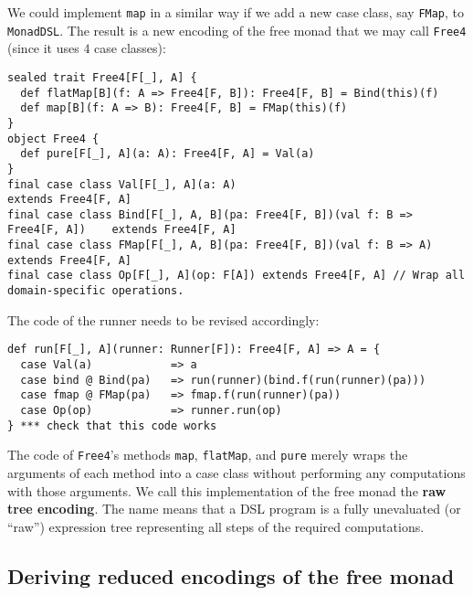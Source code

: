 We could implement \lstinline!map!
in a similar way if we add a new case class, say \lstinline!FMap!,
to \lstinline!MonadDSL!.
The result is a new encoding of the free monad that we may call \lstinline!Free4!
(since it uses $4$ case classes):
\begin{lstlisting}
sealed trait Free4[F[_], A] {
  def flatMap[B](f: A => Free4[F, B]): Free4[F, B] = Bind(this)(f)
  def map[B](f: A => B): Free4[F, B] = FMap(this)(f)
}
object Free4 {
  def pure[F[_], A](a: A): Free4[F, A] = Val(a)
}
final case class Val[F[_], A](a: A)                                            extends Free4[F, A]
final case class Bind[F[_], A, B](pa: Free4[F, B])(val f: B => Free4[F, A])    extends Free4[F, A]
final case class FMap[F[_], A, B](pa: Free4[F, B])(val f: B => A)              extends Free4[F, A]
final case class Op[F[_], A](op: F[A]) extends Free4[F, A] // Wrap all domain-specific operations.
\end{lstlisting}
The code of the runner needs to be revised accordingly:
\begin{lstlisting}
def run[F[_], A](runner: Runner[F]): Free4[F, A] => A = {
  case Val(a)            => a
  case bind @ Bind(pa)   => run(runner)(bind.f(run(runner)(pa)))
  case fmap @ FMap(pa)   => fmap.f(run(runner)(pa))
  case Op(op)            => runner.run(op)
} *** check that this code works
\end{lstlisting}
The code of \lstinline!Free4!\textsf{'}s
methods \lstinline!map!,
\lstinline!flatMap!, and
\lstinline!pure! merely
wraps the arguments of each method into a case class without performing
any computations with those arguments. We call this implementation
of the free monad the \textbf{raw tree encoding}.
The name means that a DSL program is a fully unevaluated (or \textsf{``}raw\textsf{''})
expression tree representing all steps of the required computations.

\subsection{Deriving reduced encodings of the free monad}

